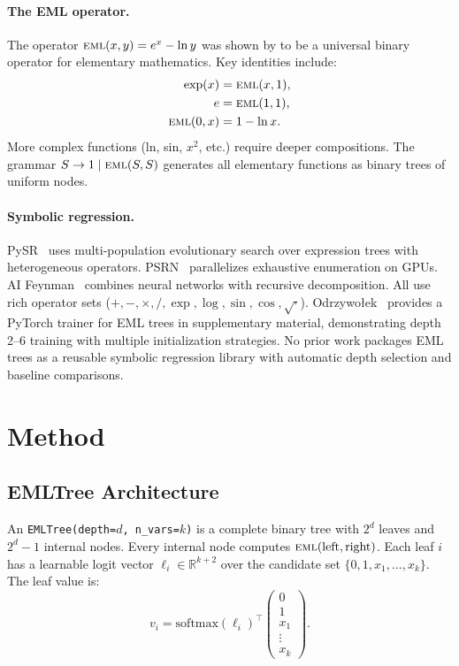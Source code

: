 \documentclass[11pt,a4paper]{article}
\newcommand{\eml}{\textsc{eml}}
\begin{document}
\paragraph{The EML operator.}
The operator $\eml(x, y) = e^x - \ln y$ was shown by \citet{odrzywołek2026eml} to be a universal binary operator for elementary mathematics.
Key identities include:
\begin{align}
    \exp(x) &= \eml(x, 1), \label{eq:exp} \\
    e &= \eml(1, 1), \\
    \eml(0, x) &= 1 - \ln x.
\end{align}
More complex functions (ln, sin, $x^2$, etc.) require deeper compositions.
The grammar $S \to 1 \mid \eml(S, S)$ generates all elementary functions as binary trees of uniform nodes.

\paragraph{Symbolic regression.}
PySR~\citep{cranmer2023pysr} uses multi-population evolutionary search over expression trees with heterogeneous operators.
PSRN~\citep{ruan2026psrn} parallelizes exhaustive enumeration on GPUs.
AI Feynman~\citep{udrescu2020aifeynman} combines neural networks with recursive decomposition.
All use rich operator sets ($+, -, \times, /, \exp, \log, \sin, \cos, \sqrt{\cdot}$).
Odrzywołek~\citep{odrzywołek2026eml} provides a PyTorch trainer for EML trees in supplementary material, demonstrating depth 2--6 training with multiple initialization strategies.
No prior work packages EML trees as a reusable symbolic regression library with automatic depth selection and baseline comparisons.

\section{Method}
\label{sec:method}

\subsection{EMLTree Architecture}

An \texttt{EMLTree(depth=$d$, n\_vars=$k$)} is a complete binary tree with $2^d$ leaves and $2^d - 1$ internal nodes.
Every internal node computes $\eml(\text{left}, \text{right})$.
Each leaf $i$ has a learnable logit vector $\boldsymbol{\ell}_i \in \mathbb{R}^{k+2}$ over the candidate set $\{0, 1, x_1, \ldots, x_k\}$.
The leaf value is:
\begin{equation}
    v_i = \text{softmax}(\boldsymbol{\ell}_i)^\top \begin{pmatrix} 0 \\ 1 \\ x_1 \\ \vdots \\ x_k \end{pmatrix}.
\end{equation}
\end{document}
